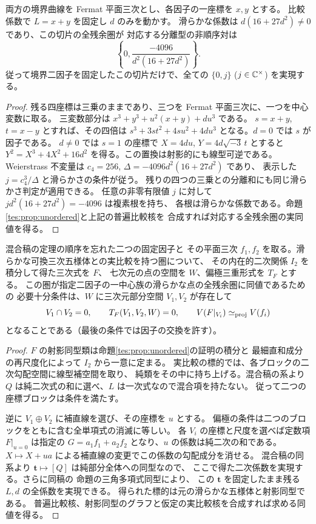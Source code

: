 \begin{corollary}\label{tes:cor:fermat-line}
両方の境界曲線を Fermat 平面三次とし、各因子の一座標を $x,y$ とする。
比較係数で $L=x+y$ を固定し $d$ のみを動かす。
滑らかな係数は $d(16+27d^2)\ne0$ であり、この切片の全残余圏が
対応する分離型の非順序対は
\[
 \left\{0,\frac{-4096}{d^2(16+27d^2)}\right\}.
\]
従って境界二因子を固定したこの切片だけで、全ての $\{0,j\}$
($j\in\mathbb C^\times$) を実現する。
\end{corollary}
\begin{proof}
残る四座標は三乗のままであり、三つを Fermat 平面三次に、一つを中心変数に取る。
三変数部分は $x^3+y^3+u^2(x+y)+du^3$ である。
$s=x+y$, $t=x-y$ とすれば、その四倍は
$s^3+3st^2+4su^2+4du^3$ となる。$d=0$ では $s$ が因子である。
$d\ne0$ では $s=1$ の座標で $X=4du$, $Y=4d\sqrt{-3}\,t$ とすると
$Y^2=X^3+4X^2+16d^2$ を得る。この置換は射影的にも線型可逆である。
Weierstrass 不変量は $c_4=256$, $\Delta=-4096d^2(16+27d^2)$ であり、
表示した $j=c_4^3/\Delta$ と滑らかさの条件が従う。
残りの四つの三乗との分離和にも同じ滑らかさ判定が適用できる。
任意の非零有限値 $j$ に対して $j d^2(16+27d^2)=-4096$ は複素根を持ち、
各根は滑らかな係数である。命題\ref{tes:prop:unordered}と上記の普遍比較核を
合成すれば対応する全残余圏の実同値を得る。
\end{proof}

\begin{corollary}[固定二因子の一中心族の認識]\label{tes:cor:hyperplane-recognition}
混合稿の定理の順序を忘れた二つの固定因子と
その平面三次 $f_1,f_2$ を取る。滑らかな可換三次五様体との実比較を持つ圏について、
その内在的二次関係 $I_2$ を積分して得た三次式を $F$、
七次元の点の空間を $W$、偏極三重形式を $T_F$ とする。
この圏が指定二因子の一中心族の滑らかな点の全残余圏に同値であるための
必要十分条件は、$W$ に三次元部分空間 $V_1,V_2$ が存在して
\[
 V_1\cap V_2=0,\qquad T_F(V_1,V_2,W)=0,\qquad
 V(F|_{V_i})\simeq_{\rm proj} V(f_i)
\]
となることである（最後の条件では因子の交換を許す）。
\end{corollary}
\begin{proof}
$F$ の射影同型類は命題\ref{tes:prop:unordered}の証明の積分と
最細直和成分の再尺度化によって $I_2$ から一意に定まる。
実比較の標的では、各ブロックの二次勾配空間に線型補空間を取り、
純類をその中に持ち上げる。混合稿の系より
$Q$ は純二次式の和に選べ、$L$ は一次式なので混合項を持たない。
従って二つの座標ブロックは条件を満たす。

逆に $V_1\oplus V_2$ に補直線を選び、その座標を $u$ とする。
偏極の条件は二つのブロックをともに含む全単項式の消滅に等しい。
各 $V_i$ の座標と尺度を選べば定数項 $F|_{u=0}$ は指定の
$G=a_1f_1+a_2f_2$ となり、$u$ の係数は純二次の和である。
$X\mapsto X+ua$ による補直線の変更でこの係数の勾配成分を消せる。
混合稿の同系より $\mathbf t\mapsto[Q]$ は純部分全体への同型なので、
ここで得た二次係数を実現する。さらに同稿の
命題の三角多項式同型により、
この $\mathbf t$ を固定したまま残る $L,d$ の全係数を実現できる。
得られた標的は元の滑らかな五様体と射影同型である。
普遍比較核、射影同型のグラフと仮定の実比較核を合成すれば求める同値を得る。
\end{proof}

